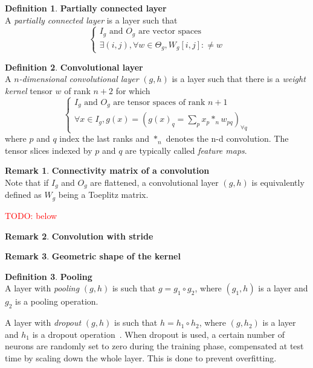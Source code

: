 \documentclass{article}
\theoremstyle{definition}
\newtheorem{definition}{Definition}[section]
\newtheorem{remark}{Remark}
\newcommand{\todo}[1]{\textcolor{red}{TODO: #1\\}}
\begin{document}
\begin{definition}\textbf{Partially connected layer}\\
A \textit{partially connected layer} is a layer such that
$$
\left\{
\begin{array}{l}
  I_g \mbox{ and } O_g \mbox{ are vector spaces}\\
  \exists (i,j), \forall w \in \Theta_g, W_g[i,j] :\neq w
\end{array}
\right.
$$
\end{definition}

\begin{definition}\textbf{Convolutional layer}\\
A \textit{$n$-dimensional convolutional layer} $(g,h)$ is a layer such that there is a \textit{weight kernel} tensor $w$ of rank $n+2$ for which
$$
\left\{
\begin{array}{l}
  I_g \mbox{ and } O_g \mbox{ are tensor spaces of rank }n+1 \\
  \forall x \in I_g, g(x) = (g(x)_q = \sum\limits_p{x_p \ast_n w_{pq}})_{\forall q}
\end{array}
\right.
$$
where $p$ and $q$ index the last ranks and $\ast_n$ denotes the n-d convolution. The tensor slices indexed by $p$ and $q$ are typically called \textit{feature maps}.
\end{definition}

\begin{remark}\textbf{Connectivity matrix of a convolution}\\
Note that if $I_g$ and $O_g$ are flattened, a convolutional layer $(g,h)$ is equivalently defined as $W_g$ being a Toeplitz matrix.
\end{remark}

\todo{below}

\begin{remark}\textbf{Convolution with stride}
\end{remark}

\begin{remark}\textbf{Geometric shape of the kernel}
\end{remark}

\begin{definition}\textbf{Pooling}\\
A layer with \textit{pooling} $(g,h)$ is such that $g = g_1 \circ g_2$, where $(g_1,h)$ is a layer and $g_2$ is a pooling operation.
\end{definition}

A layer with \textit{dropout} $(g,h)$ is such that $h = h_1 \circ h_2$, where $(g,h_2)$ is a layer and $h_1$ is a dropout operation~\cite{srivastava2014dropout}. When dropout is used, a certain number of neurons are randomly set to zero during the training phase, compensated at test time by scaling down the whole layer. This is done to prevent overfitting.
\end{document}
